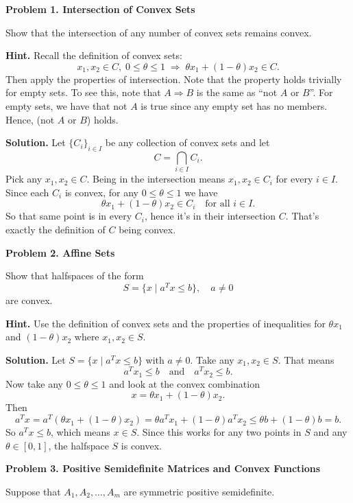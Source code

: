 \documentclass[11pt]{article}
\begin{document}
	
	\noindent\textbf{Problem 1. Intersection of Convex Sets}
	
	Show that the intersection of any number of convex sets remains convex.
	
	\noindent\textbf{Hint.} Recall the definition of convex sets:
	\[
	x_1, x_2 \in C,\; 0 \le \theta \le 1 \;\Rightarrow\; \theta x_1 + (1-\theta)x_2 \in C.
	\]
	Then apply the properties of intersection. Note that the property holds trivially for empty sets. To see this, note that $A \Rightarrow B$ is the same as ``not $A$ or $B$''. For empty sets, we have that not $A$ is true since any empty set has no members. Hence, (not $A$ or $B$) holds.
	
	\vspace{1em}
	\noindent\textbf{Solution.}
	Let $\{C_i\}_{i \in I}$ be any collection of convex sets and let
	\[
	C = \bigcap_{i \in I} C_i.
	\]
	Pick any $x_1, x_2 \in C$. Being in the intersection means $x_1, x_2 \in C_i$ for every $i \in I$. Since each $C_i$ is convex, for any $0 \le \theta \le 1$ we have
	\[
	\theta x_1 + (1-\theta)x_2 \in C_i \quad \text{for all } i \in I.
	\]
	So that same point is in every $C_i$, hence it’s in their intersection $C$. That’s exactly the definition of $C$ being convex.
	
	\vspace{1.5em}
	\noindent\textbf{Problem 2. Affine Sets}
	
	Show that halfspaces of the form
	\[
	S = \{ x \mid a^T x \le b \}, \quad a \neq 0
	\]
	are convex.
	
	\noindent\textbf{Hint.} Use the definition of convex sets and the properties of inequalities for $\theta x_1$ and $(1-\theta)x_2$ where $x_1, x_2 \in S$.
	
	\vspace{1em}
	\noindent\textbf{Solution.}
	Let $S = \{ x \mid a^T x \le b \}$ with $a \neq 0$. Take any $x_1, x_2 \in S$. That means
	\[
	a^T x_1 \le b \quad \text{and} \quad a^T x_2 \le b.
	\]
	Now take any $0 \le \theta \le 1$ and look at the convex combination
	\[
	x = \theta x_1 + (1-\theta)x_2.
	\]
	Then
	\[
	a^T x = a^T (\theta x_1 + (1-\theta)x_2)
	= \theta a^T x_1 + (1-\theta) a^T x_2
	\le \theta b + (1-\theta) b
	= b.
	\]
	So $a^T x \le b$, which means $x \in S$. Since this works for any two points in $S$ and any $\theta \in [0,1]$, the halfspace $S$ is convex.
	
	\newpage
	\noindent\textbf{Problem 3. Positive Semidefinite Matrices and Convex Functions}
	
	Suppose that $A_1, A_2, \dots, A_m$ are symmetric positive semidefinite.
	
\end{document}
